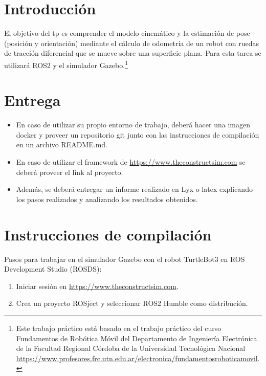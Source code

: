 \documentclass[tp]{lcc}
\begin{document}
\maketitle


\section{Introducción}

El objetivo del tp es comprender el modelo cinemático y la estimación de pose (posición y orientación) mediante el cálculo de odometría de un robot con ruedas de tracción diferencial que se mueve sobre una superficie plana. Para esta tarea se utilizará ROS2 y el simulador Gazebo.\footnote{Este trabajo práctico está basado en el trabajo práctico del curso Fundamentos de Robótica Móvil del Departamento de Ingeniería Electrónica de la Facultad Regional Córdoba de la Universidad Tecnológica Nacional \url{https://www.profesores.frc.utn.edu.ar/electronica/fundamentosroboticamovil}.}


\section{Entrega}
\begin{itemize}
    \item En caso de utilizar su propio entorno de trabajo, deberá hacer una imagen docker y proveer un repositorio git junto con las instrucciones de compilación en un archivo README.md.

    \item En caso de utilizar el framework de \url{https://www.theconstructsim.com} se deberá proveer el link al proyecto.

    \item Además, se deberá entregar un informe realizado en Lyx o latex explicando los pasos realizados y analizando los resultados obtenidos.
\end{itemize}


\section{Instrucciones de compilación}
Pasos para trabajar en el simulador Gazebo con el robot TurtleBot3 en ROS Development Studio (ROSDS):

\begin{enumerate}
	\item Iniciar sesión en \url{https://www.theconstructsim.com}.
	\item Crea un proyecto ROSject y seleccionar ROS2 Humble como distribución.
\end{enumerate}
\end{document}
